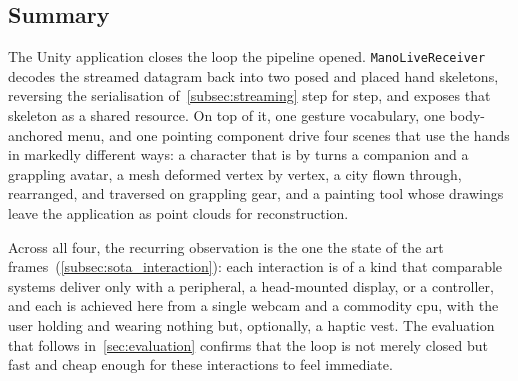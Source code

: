 \subsection{Summary}\label{subsec:application_summary}

The Unity application closes the loop the pipeline opened. \texttt{ManoLiveReceiver}
decodes the streamed datagram back into two posed and placed hand skeletons,
reversing the serialisation of~\autoref{subsec:streaming} step for step, and exposes
that skeleton as a shared resource. On top of it, one gesture vocabulary, one
body-anchored menu, and one pointing component drive four scenes that use the hands
in markedly different ways: a character that is by turns a companion and a grappling
avatar, a mesh deformed vertex by vertex, a city flown through, rearranged, and
traversed on grappling gear, and a painting tool whose drawings leave the
application as point clouds for reconstruction.

Across all four, the recurring observation is the one the state of the art
frames~(\autoref{subsec:sota_interaction}): each interaction is of a kind that
comparable systems deliver only with a peripheral, a head-mounted display, or a
controller, and each is achieved here from a single webcam and a commodity
\acrshort{cpu}, with the user holding and wearing nothing but, optionally, a haptic
vest. The evaluation that follows in~\autoref{sec:evaluation} confirms that the loop
is not merely closed but fast and cheap enough for these interactions to feel
immediate.
